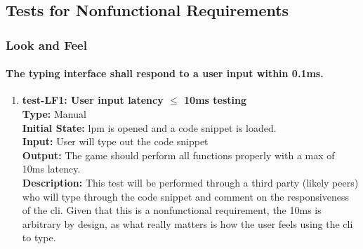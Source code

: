 \documentclass[12pt, titlepage]{article}
\begin{document}
\subsection{Tests for Nonfunctional Requirements}


\subsubsection{Look and Feel}

\paragraph{The typing interface shall respond to a user input within 0.1ms.}
\begin{enumerate}
    \item{\textbf{test-LF1: User input latency $\leq$ 10ms testing}\\}
    \textbf{Type:} Manual\\
    \textbf{Initial State:}  lpm is opened and a code snippet is loaded.\\
    \textbf{Input:} User will type out the code snippet\\
    \textbf{Output:} The game should perform all functions properly with a max of 10ms latency. \\
    \textbf{Description: } This test will be performed through a third party (likely peers) who will type through the code snippet and comment on the responsiveness of the cli. Given that this is a nonfunctional requirement, the 10ms is arbitrary by design, as what really matters is how the user feels using the cli to type.\\
\end{enumerate}
\end{document}
